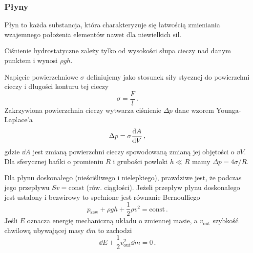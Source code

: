 \documentclass[../main.tex]{subfiles}
\begin{document}
\subsubsection{Płyny}
Płyn to każda substancja, która charakteryzuje się łatwością zmieniania wzajemnego położenia
elementów nawet dla niewielkich sił.
\medskip

\noindent{}
\medskip

\noindent{}
\medskip

Ciśnienie hydrostatyczne zależy tylko od wysokości słupa cieczy nad danym punktem i wynosi \(\rho
gh\).
\medskip

Napięcie powierzchniowe \(\sigma\) definiujemy jako stosunek siły stycznej do powierzchni cieczy i
długości konturu tej cieczy
\begin{equation*}
    \sigma=\frac{F}{l}\,.
\end{equation*}
Zakrzywiona powierzchnia cieczy wytwarza ciśnienie \(\Delta p\) dane wzorem Younga-Laplace'a
\begin{equation*}
    \Delta p=\sigma \dv{A}{V}\,,
\end{equation*}
gdzie \(\dd{A}\) jest zmianą powierzchni cieczy spowodowaną zmianą jej objętości o \(\dd{V}\). Dla
sferycznej bańki o promieniu \(R\) i grubości powłoki \(h\ll R\) mamy \(\Delta p=4\sigma/R\).
\medskip

Dla płynu doskonałego (nieściśliwego i nielepkiego), prawdziwe jest, że podczas jego przepływu
\(Sv=\text{const}\) (rów. ciągłości). Jeżeli przepływ płynu doskonałego jest ustalony i bezwirowy to
spełnione jest równanie Bernoulliego
\begin{equation*}
    p_\text{zew}+\rho gh+\frac{1}{2}\rho v^2=\text{const}\,.
\end{equation*}
Jeśli \(E\) oznacza energię mechaniczną układu o zmiennej masie, a \(v_\text{out}\) szybkość
chwilową ubywającej masy \(\dd{m}\) to zachodzi
\begin{equation*}
    \dd{E}+\frac{1}{2}v_\text{out}^2\dd{m}=0\,.
\end{equation*}
\end{document}
